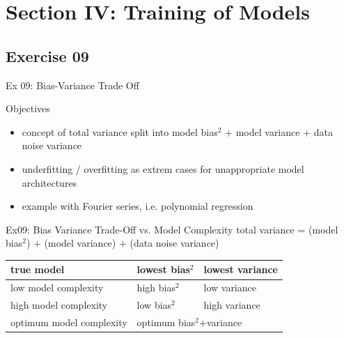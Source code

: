 \documentclass[mathserif, aspectratio=1610]{intbeamer}
\begin{document}
\section{Section IV: Training of Models}

\subsection{Exercise 09}
\begin{frame}{Ex 09: Bias-Variance Trade Off}

Objectives
\begin{itemize}
\item concept of total variance split into model bias$^2$ + model variance + data noise variance
\item underfitting / overfitting as extrem cases for unappropriate model architectures
\item example with Fourier series, i.e. polynomial regression
\end{itemize}

\end{frame}


\begin{frame}[t]{Ex09: Bias Variance Trade-Off vs. Model Complexity}
%
\vspace{-1em}
%
total variance = (model bias$^2$) + (model variance) + (data noise variance)
%
\begin{table}[]
\begin{tabular}{|l|l|l|}
\hline
true model &  lowest bias$^2$ &  lowest variance\\\hline
low model complexity &  high bias$^2$ &  low variance\\\hline
high model complexity & low bias$^2$ & high variance\\\hline
optimum model complexity & \multicolumn{2}{l|}{optimum bias$^2$+variance}\\\hline
\end{tabular}
\end{table}
%
\begin{center}
\end{center}
%
\end{frame}
\end{document}
